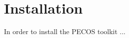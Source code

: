 \chapter{Installation}\label{ch-install}
\thispagestyle{headings}

In order to install the PECOS toolkit ...

